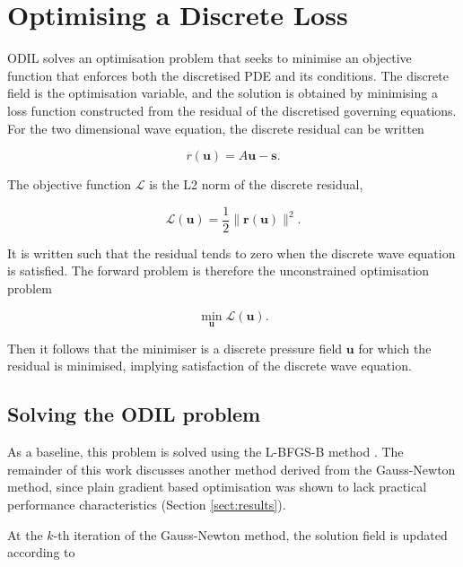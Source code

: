 \documentclass[final-report]{report-template}
\begin{document}
\section{Optimising a Discrete Loss}

ODIL solves an optimisation problem that seeks to minimise an objective function that enforces both the discretised PDE and its conditions. The discrete field is the optimisation variable, and the solution is obtained by minimising a loss function constructed from the residual of the discretised governing equations. For the two dimensional wave equation, the discrete residual can be written

\begin{equation}
    r(\mathbf{u}) = A \mathbf{u} - \mathbf{s}.
    \label{eq:residual}
\end{equation}

The objective function $\mathcal{L}$ is the L2 norm of the discrete residual, 

\begin{equation}
    \mathcal{L}(\mathbf{u}) = \frac 1 2 \|\mathbf{r}(\mathbf{u})\|^2.
    \label{eq:cont_loss}
\end{equation}

It is written such that the residual tends to zero when the discrete wave equation is satisfied. The forward problem is therefore the unconstrained optimisation problem

\begin{equation}
    \min_{\mathbf{u}}\mathcal{L}(\mathbf{u}).
\end{equation}

Then it follows that the minimiser is a discrete pressure field $\mathbf{u}$ for which the residual is minimised, implying satisfaction of the discrete wave equation.

\subsection{Solving the ODIL problem}

As a baseline, this problem is solved using the L-BFGS-B method \cite{xiaoNewSubspaceLimited2007}. The remainder of this work discusses another method derived from the Gauss-Newton method, since plain gradient based optimisation was shown to lack practical performance characteristics (Section \ref{sect:results}).

At the $k$-th iteration of the Gauss-Newton method, the solution field is updated according to 
\end{document}
